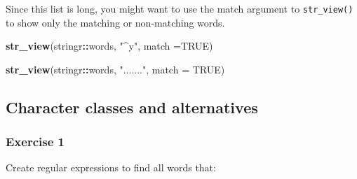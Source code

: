\documentclass[]{book}
\newenvironment{Shaded}{\begin{snugshade}}{\end{snugshade}}
\newcommand{\DataTypeTok}[1]{\textcolor[rgb]{0.13,0.29,0.53}{#1}}
\newcommand{\KeywordTok}[1]{\textcolor[rgb]{0.13,0.29,0.53}{\textbf{#1}}}
\newcommand{\NormalTok}[1]{#1}
\newcommand{\OperatorTok}[1]{\textcolor[rgb]{0.81,0.36,0.00}{\textbf{#1}}}
\newcommand{\OtherTok}[1]{\textcolor[rgb]{0.56,0.35,0.01}{#1}}
\newcommand{\StringTok}[1]{\textcolor[rgb]{0.31,0.60,0.02}{#1}}
\theoremstyle{plain}
\theoremstyle{remark}
\theoremstyle{definition}
\theoremstyle{definition}
\theoremstyle{definition}
\theoremstyle{remark}
\begin{document}
Since this list is long, you might want to use the match argument to
\texttt{str\_view()} to show only the matching or non-matching words.

\begin{Shaded}
\begin{Highlighting}[]
\KeywordTok{str_view}\NormalTok{(stringr}\OperatorTok{::}\NormalTok{words, }\StringTok{"^y"}\NormalTok{, }\DataTypeTok{match =}\OtherTok{TRUE}\NormalTok{)}
\end{Highlighting}
\end{Shaded}

\begin{Shaded}
\end{Shaded}

\begin{Shaded}
\end{Shaded}

\begin{Shaded}
\begin{Highlighting}[]
\KeywordTok{str_view}\NormalTok{(stringr}\OperatorTok{::}\NormalTok{words, }\StringTok{"......."}\NormalTok{, }\DataTypeTok{match =} \OtherTok{TRUE}\NormalTok{)}
\end{Highlighting}
\end{Shaded}

\hypertarget{character-classes-and-alternatives}{%
\subsection{Character classes and
alternatives}\label{character-classes-and-alternatives}}

\hypertarget{exercise-1-33}{%
\subsubsection{Exercise 1}\label{exercise-1-33}}

Create regular expressions to find all words that:
\end{document}
